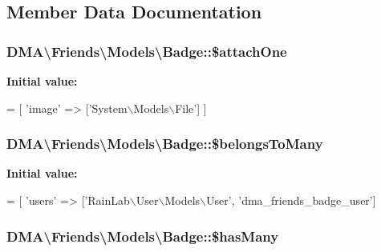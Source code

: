 \subsection{Member Data Documentation}
\hypertarget{classDMA_1_1Friends_1_1Models_1_1Badge_abd4795b249f74dd23651f51479fbe5fb}{
\subsubsection[{\$attach\-One}]{\setlength{\rightskip}{0pt plus 5cm}D\-M\-A\textbackslash{}\-Friends\textbackslash{}\-Models\textbackslash{}\-Badge\-::\$attach\-One}}\label{classDMA_1_1Friends_1_1Models_1_1Badge_abd4795b249f74dd23651f51479fbe5fb}
{\bfseries Initial value\-:}
\begin{DoxyCode}
= [
        \textcolor{stringliteral}{'image'} => [\textcolor{stringliteral}{'System\(\backslash\)Models\(\backslash\)File'}]
    ]
\end{DoxyCode}
\hypertarget{classDMA_1_1Friends_1_1Models_1_1Badge_ab143958e8f63d5b612832fee145f0aa1}{
\subsubsection[{\$belongs\-To\-Many}]{\setlength{\rightskip}{0pt plus 5cm}D\-M\-A\textbackslash{}\-Friends\textbackslash{}\-Models\textbackslash{}\-Badge\-::\$belongs\-To\-Many}}\label{classDMA_1_1Friends_1_1Models_1_1Badge_ab143958e8f63d5b612832fee145f0aa1}
{\bfseries Initial value\-:}
\begin{DoxyCode}
= [
        \textcolor{stringliteral}{'users'} => [\textcolor{stringliteral}{'RainLab\(\backslash\)User\(\backslash\)Models\(\backslash\)User'}, \textcolor{stringliteral}{'dma\_friends\_badge\_user'}]
\end{DoxyCode}
\hypertarget{classDMA_1_1Friends_1_1Models_1_1Badge_a1b363de2d8c44cd12dff6bca90a6b212}{
\subsubsection[{\$has\-Many}]{\setlength{\rightskip}{0pt plus 5cm}D\-M\-A\textbackslash{}\-Friends\textbackslash{}\-Models\textbackslash{}\-Badge\-::\$has\-Many}}\label{classDMA_1_1Friends_1_1Models_1_1Badge_a1b363de2d8c44cd12dff6bca90a6b212}
